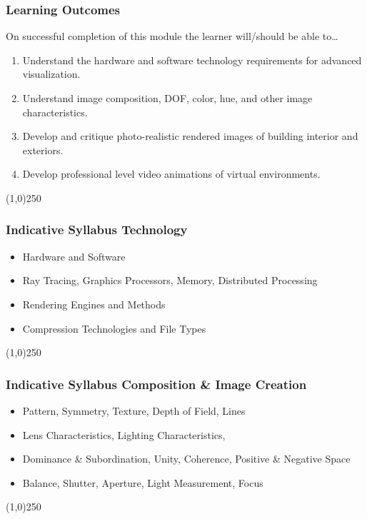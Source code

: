  
 \begin{frame}
\frametitle{Learning Outcomes}
On successful completion of this module the learner will/should be able to\ldots
\begin{enumerate}
	\item Understand the hardware and software technology requirements for advanced visualization.
	\item Understand image composition, DOF, color, hue, and other image characteristics.
	\item Develop and critique photo-realistic rendered images of building interior and exteriors.
	\item Develop professional level video animations of virtual environments.
\end{enumerate}
\end{frame}
\begin{center}\line(1,0){250}\end{center}



\begin{frame}
\frametitle{Indicative Syllabus \hfill\hfill Technology}

\begin{itemize}
	\item Hardware and Software
	\item Ray Tracing, Graphics Processors, Memory, Distributed Processing
	\item Rendering Engines and Methods
	\item Compression Technologies and File Types
\end{itemize}
\end{frame}
\begin{center}\line(1,0){250}\end{center}



\begin{frame}
\frametitle{Indicative Syllabus \hfill\hfill Composition \& Image Creation}

\begin{itemize}
	\item Pattern, Symmetry, Texture, Depth of Field, Lines
	\item Lens Characteristics, Lighting Characteristics, 
	\item Dominance \& Subordination, Unity, Coherence, Positive \& Negative Space
	\item Balance, Shutter, Aperture, Light Measurement, Focus
\end{itemize}
\end{frame}
\begin{center}\line(1,0){250}\end{center}


